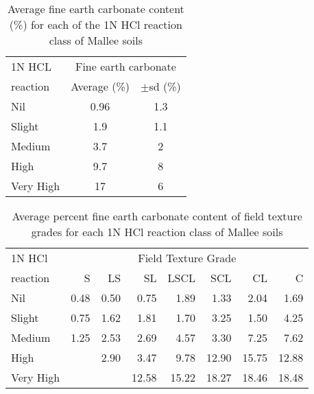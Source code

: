 \begin{table}[ht]
\centering
\caption{Average fine earth carbonate content (\%) for each of the 1N HCl reaction class of Mallee soils} 
\label{tab01}
\begin{tabular}{lcc}
  \hline
1N HCL & \multicolumn{2}{c}{Fine earth carbonate}\\
reaction & Average (\%) & $\pm$sd (\%) \\ 
  \hline
Nil & 0.96 & 1.3 \\ 
  Slight & 1.9 & 1.1 \\ 
  Medium & 3.7 &   2 \\ 
  High & 9.7 &   8 \\ 
  Very High &  17 &   6 \\ 
   \hline
\end{tabular}
\end{table}
\begin{table}[ht]
	\centering
	\caption{Average percent fine earth carbonate content of field texture grades for each 1N HCl reaction class of Mallee soils} 
	\label{tab02}
	\begin{tabular}{lrrrrrrr}
		\hline
		1N HCl & \multicolumn{7}{c}{Field Texture Grade}\\
		reaction & S & LS & SL & LSCL & SCL & CL & C \\ 
		\hline
		Nil & 0.48 & 0.50 & 0.75 & 1.89 & 1.33 & 2.04 & 1.69 \\ 
		Slight & 0.75 & 1.62 & 1.81 & 1.70 & 3.25 & 1.50 & 4.25 \\ 
		Medium & 1.25 & 2.53 & 2.69 & 4.57 & 3.30 & 7.25 & 7.62 \\ 
		High &  & 2.90 & 3.47 & 9.78 & 12.90 & 15.75 & 12.88 \\ 
		Very High &  &  & 12.58 & 15.22 & 18.27 & 18.46 & 18.48 \\ 
		\hline
	\end{tabular}
\end{table}
